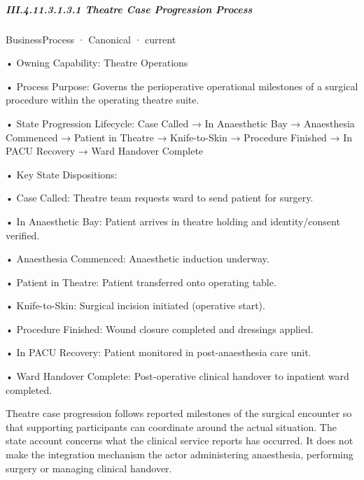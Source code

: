 \subparagraph*{III.4.11.3.1.3.1 Theatre Case Progression Process}
\label{navigation:III.4.11.3.1.3.1}

\label{element:8ad97120b5b54a31a64a4522e6bc9fd1}
{\small BusinessProcess · Canonical · current}\par

•
Owning Capability: Theatre Operations



•
Process Purpose: Governs the perioperative operational milestones of a surgical procedure within the operating theatre suite.



•
State Progression Lifecycle: Case Called → In Anaesthetic Bay → Anaesthesia Commenced → Patient in Theatre → Knife-to-Skin → Procedure Finished → In PACU Recovery → Ward Handover Complete



•
Key State Dispositions:



•
Case Called: Theatre team requests ward to send patient for surgery.



•
In Anaesthetic Bay: Patient arrives in theatre holding and identity/consent verified.



•
Anaesthesia Commenced: Anaesthetic induction underway.



•
Patient in Theatre: Patient transferred onto operating table.



•
Knife-to-Skin: Surgical incision initiated (operative start).



•
Procedure Finished: Wound closure completed and dressings applied.



•
In PACU Recovery: Patient monitored in post-anaesthesia care unit.



•
Ward Handover Complete: Post-operative clinical handover to inpatient ward completed.



Theatre case progression follows reported milestones of the surgical encounter so that supporting participants can coordinate around the actual situation. The state account concerns what the clinical service reports has occurred. It does not make the integration mechanism the actor administering anaesthesia, performing surgery or managing clinical handover.


